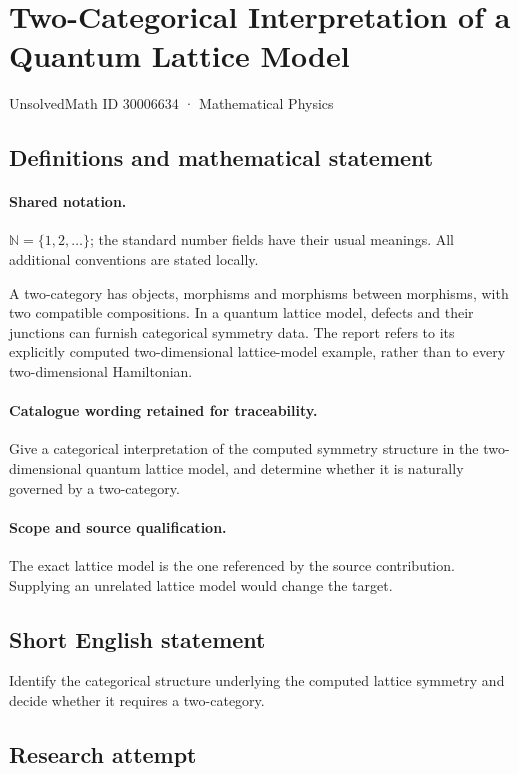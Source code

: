 \documentclass[11pt]{article}
\begin{document}
\setcounter{section}{30006633}
\section{Two-Categorical Interpretation of a Quantum Lattice Model}\label{30006634}
{\small UnsolvedMath ID 30006634 · Mathematical Physics}
\subsection{Definitions and mathematical statement}

\paragraph{Shared notation.}$\mathbb N=\{1,2,\ldots\}$; the standard number fields have their usual meanings. All additional conventions are stated locally.


A two-category has objects, morphisms and morphisms between morphisms, with two compatible compositions. In a quantum lattice model, defects and their junctions can furnish categorical symmetry data. The report refers to its explicitly computed two-dimensional lattice-model example, rather than to every two-dimensional Hamiltonian.

\paragraph{Catalogue wording retained for traceability.}
Give a categorical interpretation of the computed symmetry structure in the two-dimensional quantum lattice model, and determine whether it is naturally governed by a two-category.

\paragraph{Scope and source qualification.}The exact lattice model is the one referenced by the source contribution. Supplying an unrelated lattice model would change the target.
\subsection{Short English statement}
Identify the categorical structure underlying the computed lattice symmetry and decide whether it requires a two-category.
\subsection{Research attempt}
\end{document}
